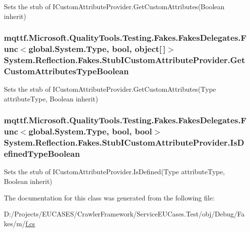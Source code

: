 Sets the stub of I\-Custom\-Attribute\-Provider.\-Get\-Custom\-Attributes(\-Boolean inherit)

\hypertarget{class_system_1_1_reflection_1_1_fakes_1_1_stub_i_custom_attribute_provider_ab95aa53c660232205b4324be2cf8b53f}{
\subsubsection[{Get\-Custom\-Attributes\-Type\-Boolean}]{\setlength{\rightskip}{0pt plus 5cm}mqttf.\-Microsoft.\-Quality\-Tools.\-Testing.\-Fakes.\-Fakes\-Delegates.\-Func$<$global.\-System.\-Type, bool, object\mbox{[}$\,$\mbox{]}$>$ System.\-Reflection.\-Fakes.\-Stub\-I\-Custom\-Attribute\-Provider.\-Get\-Custom\-Attributes\-Type\-Boolean}}\label{class_system_1_1_reflection_1_1_fakes_1_1_stub_i_custom_attribute_provider_ab95aa53c660232205b4324be2cf8b53f}


Sets the stub of I\-Custom\-Attribute\-Provider.\-Get\-Custom\-Attributes(\-Type attribute\-Type, Boolean inherit)

\hypertarget{class_system_1_1_reflection_1_1_fakes_1_1_stub_i_custom_attribute_provider_a1db8ad33b7aa2b98abc3f4dd37ba9dc5}{
\subsubsection[{Is\-Defined\-Type\-Boolean}]{\setlength{\rightskip}{0pt plus 5cm}mqttf.\-Microsoft.\-Quality\-Tools.\-Testing.\-Fakes.\-Fakes\-Delegates.\-Func$<$global.\-System.\-Type, bool, bool$>$ System.\-Reflection.\-Fakes.\-Stub\-I\-Custom\-Attribute\-Provider.\-Is\-Defined\-Type\-Boolean}}\label{class_system_1_1_reflection_1_1_fakes_1_1_stub_i_custom_attribute_provider_a1db8ad33b7aa2b98abc3f4dd37ba9dc5}


Sets the stub of I\-Custom\-Attribute\-Provider.\-Is\-Defined(\-Type attribute\-Type, Boolean inherit)



The documentation for this class was generated from the following file\-:\begin{DoxyCompactItemize}
\item 
D\-:/\-Projects/\-E\-U\-C\-A\-S\-E\-S/\-Crawler\-Framework/\-Service\-E\-U\-Cases.\-Test/obj/\-Debug/\-Fakes/m/\hyperlink{m_2f_8cs}{f.\-cs}\end{DoxyCompactItemize}
